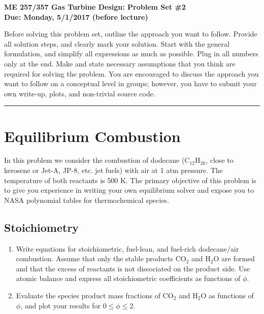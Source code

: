 \documentclass[11pt]{article}
\def\hwnum{2}
\begin{document}
\begin{center}
{\Large\bf ME 257/357 Gas Turbine Design: Problem Set \#\hwnum\\
       Due: Monday, 5/1/2017 (before lecture)}
\end{center}

Before solving this problem set, outline the approach you want to follow. Provide all solution steps, and clearly mark your solution. Start with the general formulation, and simplify all expressions as much as possible. Plug in all numbers only at the end. Make and state necessary assumptions that you
think are required for solving the problem. You are encouraged to discuss the approach you want to follow on a conceptual level in groups; however, you have to submit your own write-up, plots, and non-trivial source code.
\\
\hrule
\section{Equilibrium Combustion}
In this problem we consider the combustion of dodecane ($\mathrm{C_{12}H_{26}}$, close to kerosene or Jet-A, JP-8, etc. jet fuels) with air at 1 atm pressure.  The temperature of both reactants is 500 K.  The primary objective of this problem is to give you experience in writing your own equilibrium solver and expose you to NASA polynomial tables for thermochemical species.
\subsection{Stoichiometry}
\begin{enumerate}[label=(\alph*)]
	\item
    	Write equations for stoichiometric, fuel-lean, and fuel-rich dodecane/air combustion.  Assume that only the stable products $\mathrm{CO_2}$ and $\mathrm{H_2O}$ are formed and that the excess of reactants is not dissociated on the product side.  Use atomic balance and express all stoichiometric coefficients as functions of $\phi$.
    \item
    	Evaluate the species product mass fractions of $\mathrm{CO_2}$ and $\mathrm{H_2O}$ as functions of $\phi$, and plot your results for $0 \le \phi \le 2$.
\end{enumerate}
\end{document}
